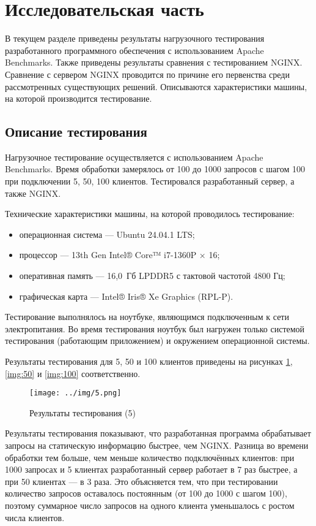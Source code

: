 \section{Исследовательская часть}

В текущем разделе приведены результаты нагрузочного тестирования разработанного программного обеспечения с использованием Apache Benchmarks.
Также приведены результаты сравнения с тестированием NGINX.
Сравнение с сервером NGINX проводится по причине его первенства среди рассмотренных существующих решений.
Описываются характеристики машины, на которой производится тестирование.

\subsection{Описание тестирования}

Нагрузочное тестирование осуществляется с использованием Apache Benchmarks.
Время обработки замерялось от 100 до 1000 запросов с шагом 100 при подключении 5, 50, 100 клиентов.
Тестировался разработанный сервер, а также NGINX.

Технические характеристики машины, на которой проводилось тестирование:
\begin{itemize}
	\item операционная система --- Ubuntu 24.04.1 LTS;
	\item процессор --- 13th Gen Intel® Core™ i7-1360P × 16;
	\item оперативная память --- 16,0 Гб LPDDR5 с тактовой частотой 4800 Гц;
	\item графическая карта --- Intel® Iris® Xe Graphics (RPL-P).
\end{itemize}

Тестирование выполнялось на ноутбуке, являющимся подключенным к сети электропитания.
Во время тестирования ноутбук был нагружен только системой тестирования (работающим приложением) и окружением операционной системы.

Результаты тестирования для 5, 50 и 100 клиентов приведены на рисунках \ref{img:5}, \ref{img:50} и \ref{img:100} соответственно.

\begin{figure}[!htb]\centering
	\texttt{[image: ../img/5.png]}
	\caption{Результаты тестирования (5)}
	\label{img:5}
\end{figure}

Результаты тестирования показывают, что разработанная программа обрабатывает запросы на статическую информацию быстрее, чем NGINX.
Разница во времени обработки тем больше, чем меньше количество подключённых клиентов: при 1000 запросах и 5 клиентах разработанный сервер работает в 7 раз быстрее, а при 50 клиентах — в 3 раза.
Это объясняется тем, что при тестировании количество запросов оставалось постоянным (от 100 до 1000 с шагом 100), поэтому суммарное число запросов на одного клиента уменьшалось с ростом числа клиентов.


